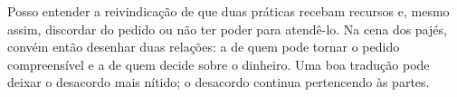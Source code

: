Posso entender a reivindicação de que duas práticas recebam recursos e, mesmo assim, discordar do pedido ou não ter poder para atendê-lo. Na cena dos pajés, convém então desenhar duas relações: a de quem pode tornar o pedido compreensível e a de quem decide sobre o dinheiro. Uma boa tradução pode deixar o desacordo mais nítido; o desacordo continua pertencendo às partes.
